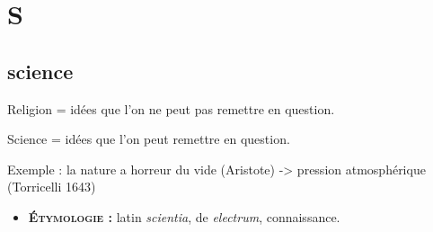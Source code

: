 \chapter{S}
\section{science}
Religion = idées que l'on ne peut pas remettre en question.

Science = idées que l'on peut remettre en question.

Exemple : la nature a horreur du vide (Aristote) -> pression atmosphérique (Torricelli 1643)
{\footnotesize
\begin{itemize}[leftmargin=1cm, label=, itemsep=1pt]
\item {\bf \textsc{Étymologie} :} latin {\it scientia}, de {\it electrum}, connaissance.
\end{itemize}
}
